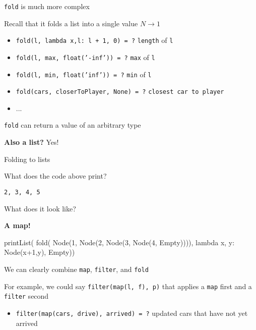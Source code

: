 \documentclass{beamer}
\begin{document}
\begin{slide}{
\item \texttt{fold} is much more complex
\item Recall that it folds a list into a single value $N \rightarrow 1$
\begin{itemize}
\item \texttt{fold(l, lambda x,l: l + 1, 0) = ?} \pause \texttt{length} of \texttt{l}
\item \texttt{fold(l, max, float('-inf')) = ?} \pause \texttt{max} of \texttt{l}
\item \texttt{fold(l, min, float('inf')) = ?} \pause \texttt{min} of \texttt{l}
\item \texttt{fold(cars, closerToPlayer, None) = ?} \pause \texttt{closest car to player}
\item ...
\end{itemize}
}\end{slide}

\begin{slide}{
\item \texttt{fold} can return a value of an arbitrary type
\item \textbf{Also a list?} \pause Yes!
}\end{slide}

\begin{frame}[fragile]{Folding to lists}
\begin{codewithblock}{\item What does the code above print? \pause \item \texttt{2, 3, 4, 5} \item What does it look like? \pause \item \textbf{A map!}}
printList(
  fold(
    Node(1, Node(2, Node(3, Node(4, Empty)))), 
    lambda x, y: Node(x+1,y), 
    Empty))
\end{codewithblock}
\end{frame}

\begin{slide}{
\item We can clearly combine \texttt{map}, \texttt{filter}, and \texttt{fold}
\item For example, we could say \texttt{filter(map(l, f), p)} that applies a \texttt{map} first and a \texttt{filter} second
\begin{itemize}
\item \texttt{filter(map(cars, drive), arrived) = ?} \pause updated cars that have not yet arrived
\end{itemize}
}\end{slide}
\end{document}

